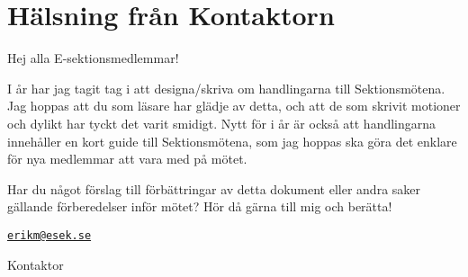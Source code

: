 \documentclass[../_main/handlingar.tex]{subfiles}
\begin{document}
\section{Hälsning från Kontaktorn} %
Hej alla E-sektionsmedlemmar!

I år har jag tagit tag i att designa/skriva om handlingarna till Sektionsmötena. Jag hoppas att du som läsare har glädje av detta, och att de som skrivit motioner och dylikt har tyckt det varit smidigt. Nytt för i år är också att handlingarna innehåller en kort guide till Sektionsmötena, som jag hoppas ska göra det enklare för nya medlemmar att vara med på mötet.

Har du något förslag till förbättringar av detta dokument eller andra saker gällande förberedelser inför mötet? Hör då gärna till mig och berätta!

\href{mailto:erikm@esek.se}{\texttt{erikm@esek.se}}

\begin{signatures}{1}
    \mvh
    \signature{\sekr}{Kontaktor}
\end{signatures}
\end{document}
